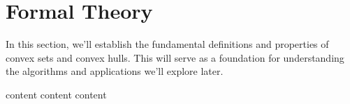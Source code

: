 \clearpage
\section{Formal Theory}
\label{sec:formal-theory}

In this section, we'll establish the fundamental definitions and properties of convex sets and convex hulls. This will serve as a foundation for understanding the algorithms and applications we'll explore later.

{content}
{content}
{content} 